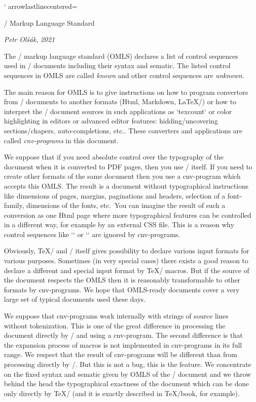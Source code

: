 \fontfam[lm]
\activettchar`
\enlang
\enquotes
\def\labitem[#1]{\label[#1]\wlabel{\the\_itemnum}}
\let\_narrowlastlinecentered=\ignoreit

\tit \OpTeX/ Markup Language Standard

{\it\hfil Petr Olšák, 2021}\bigskip

The \OpTeX/ markup language standard (OMLS) declares a list of control
sequences used in \OpTeX/ documents including their syntax and sematic. The
listed control sequences in OMLS are called {\it known} and other control
sequences are {\it unknown}.

The main reason for OMLS is to give instructions on how to program convertors
from \OpTeX/ documents to another formats (Html, Markdown, \LaTeX/) or how
to interpret the \OpTeX/ document sources in such applications as
`texcount` or color highlighting in editors\fnote
{or advanced editor features: hidding/uncovering sections/chapers,
 auto-completions, etc.}.
These converters and applications are called {\it cnv-programs} in this document.

We suppose that if you need absolute control over the typography of the
document when it is converted to PDF pages, then you use \OpTeX/ itself. If
you need to create other formats of the same document then you use a
cnv-program which accepts this OMLS. The result is a document without
typographical instructions like dimensions of pages, margins, paginations
and headers, selection of a font-family, dimensions of the fonts, etc.\ You can
imagine the result of such a conversion as one Html page where more
typographical features can be controlled in a different way, for example by
an external CSS file. This is a reason why control sequences like `\fontfam` or
`\margins` are ignored by cnv-programs.

Obviously, \TeX/ and \OpTeX/ itself gives possibility to declare various
input formats for various purposes. Sometimes (in very special cases) there
exists a good reason to declare a different and special input format by
\TeX/ macros. But if the source of the document respects the OMLS then it is
reasonably transformable to other formats by cnv-programs. We hope that
OMLS-ready documents cover a very large set of typical documents used these
days.

We suppose that cnv-programs work internally with strings of source lines
without tokenization. This is one of the great difference in processing the
document directly by \OpTeX/ and using a cnv-program. The second difference is
that the expansion process of macros is not implemented in cnv-programs in
its full range. We respect that the result of cnv-programs will be different
than from processing directly by \OpTeX/. But this is not a bug, this is
the feature. We concentrate on the fixed syntax and sematic given by OMLS of the
\OpTeX/ document and we throw behind the head the typographical
exactness of the document which can be done only directly by \TeX/ (and it is
exactly described in \TeX/book, for example).

